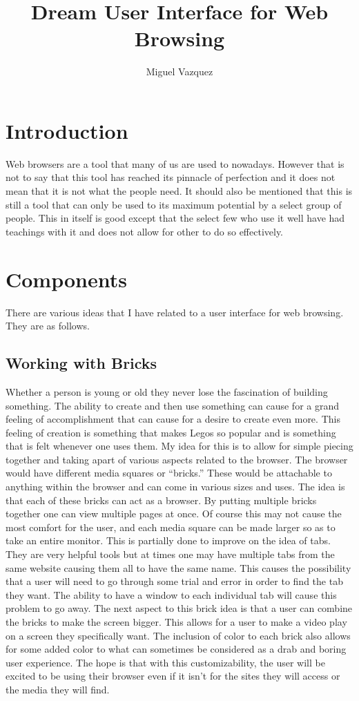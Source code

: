 \documentclass[11pt]{article}
\title{Dream User Interface for Web Browsing}
\author{Miguel Vazquez}
\begin{document}
\maketitle
\tableofcontents

\section{Introduction}
Web browsers are a tool that many of us are used to nowadays. However that is not to say that this tool has reached its pinnacle of perfection and it does not mean that it is not what the people need. It should also be mentioned that this is still a tool that can only be used to its maximum potential by a select group of people. This in itself is good except that the select few who use it well have had teachings with it and does not allow for other to do so effectively. 

\section{Components}
There are various ideas that I have related to a user interface for web browsing. They are as follows.

\subsection{Working with Bricks}
Whether a person is young or old they never lose the fascination of building something. The ability to create and then use something can cause for a grand feeling of accomplishment that can cause for a desire to create even more. This feeling of creation is something that makes Legos so popular and is something that is felt whenever one uses them. My idea for this is to allow for simple piecing together and taking apart of various aspects related to the browser. The browser would have different media squares or “bricks.” These would be attachable to anything within the browser and can come in various sizes and uses. The idea is that each of these bricks can act as a browser. By putting multiple bricks together one can view multiple pages at once. Of course this may not cause the most comfort for the user, and each media square can be made larger so as to take an entire monitor. This is partially done to improve on the idea of tabs. They are very helpful tools but at times one may have multiple tabs from the same website causing them all to have the same name. This causes the possibility that a user will need to go through some trial and error in order to find the tab they want. The ability to have a window to each individual tab will cause this problem to go away. The next aspect to this brick idea is that a user can combine the bricks to make the screen bigger. This allows for a user to make a video play on a screen they specifically want. The inclusion of color to each brick also allows for some added color to what can sometimes be considered as a drab and boring user experience. The hope is that with this customizability, the user will be excited to be using their browser even if it isn’t for the sites they will access or the media they will find.
\end{document}
